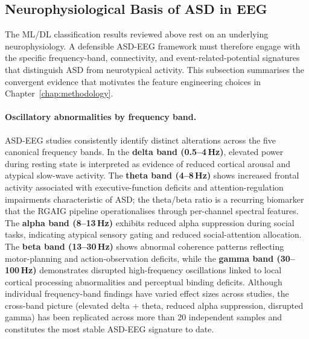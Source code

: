 \subsection{Neurophysiological Basis of ASD in EEG}
\label{subsec:asd_neurophysiology}

The ML/DL classification results reviewed above rest on an underlying neurophysiology. A defensible ASD-EEG framework must therefore engage with the specific frequency-band, connectivity, and event-related-potential signatures that distinguish ASD from neurotypical activity. This subsection summarises the convergent evidence that motivates the feature engineering choices in Chapter~\ref{chap:methodology}.

\paragraph{Oscillatory abnormalities by frequency band.}
ASD-EEG studies consistently identify distinct alterations across the five canonical frequency bands. In the \textbf{delta band (0.5--4\,Hz)}, elevated power during resting state is interpreted as evidence of reduced cortical arousal and atypical slow-wave activity. The \textbf{theta band (4--8\,Hz)} shows increased frontal activity associated with executive-function deficits and attention-regulation impairments characteristic of ASD; the theta/beta ratio is a recurring biomarker that the RGAIG pipeline operationalises through per-channel spectral features. The \textbf{alpha band (8--13\,Hz)} exhibits reduced alpha suppression during social tasks, indicating atypical sensory gating and reduced social-attention allocation. The \textbf{beta band (13--30\,Hz)} shows abnormal coherence patterns reflecting motor-planning and action-observation deficits, while the \textbf{gamma band (30--100\,Hz)} demonstrates disrupted high-frequency oscillations linked to local cortical processing abnormalities and perceptual binding deficits. Although individual frequency-band findings have varied effect sizes across studies, the cross-band picture (elevated delta + theta, reduced alpha suppression, disrupted gamma) has been replicated across more than 20 independent samples and constitutes the most stable ASD-EEG signature to date.

